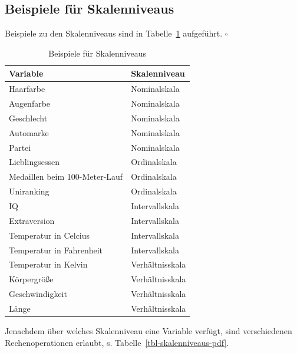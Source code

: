 \documentclass[
  a4paper,
]{scrbook}
\theoremstyle{definition}
\theoremstyle{definition}
\theoremstyle{definition}
\theoremstyle{remark}
\begin{document}
\subsection{Beispiele für
Skalenniveaus}\label{beispiele-fuxfcr-skalenniveaus}

Beispiele zu den Skalenniveaus sind in Tabelle~\ref{tbl-skalen-bsps}
aufgeführt. \(\square\)

\begin{longtable}[]{@{}ll@{}}

\caption{\label{tbl-skalen-bsps}Beispiele für Skalenniveaus}

\tabularnewline

\toprule\noalign{}
Variable & Skalenniveau \\
\midrule\noalign{}
\endhead
\bottomrule\noalign{}
\endlastfoot
Haarfarbe & Nominalskala \\
Augenfarbe & Nominalskala \\
Geschlecht & Nominalskala \\
Automarke & Nominalskala \\
Partei & Nominalskala \\
Lieblingsessen & Ordinalskala \\
Medaillen beim 100-Meter-Lauf & Ordinalskala \\
Uniranking & Ordinalskala \\
IQ & Intervallskala \\
Extraversion & Intervallskala \\
Temperatur in Celcius & Intervallskala \\
Temperatur in Fahrenheit & Intervallskala \\
Temperatur in Kelvin & Verhältnisskala \\
Körpergröße & Verhältnisskala \\
Geschwindigkeit & Verhältnisskala \\
Länge & Verhältnisskala \\

\end{longtable}

Jenachdem über welches Skalenniveau eine Variable verfügt, sind
verschiedenen Rechenoperationen erlaubt, s.
{Tabelle~\ref{tbl-skalenniveaus-pdf}}.
\end{document}
